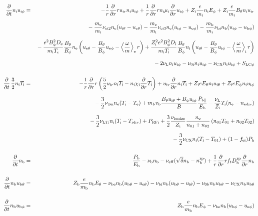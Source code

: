 \documentclass[11pt]{article}
\def\r#1{{\rm#1}}
\def\ddt{\frac{\partial}{\partial t}}
\def\ddr{\frac{\partial}{\partial r}}
\def\ave#1{\left\langle#1\right\rangle}
\def\me{m_\r{e}}
\def\mi{m_\r{i}}
\def\mb{m_\r{b}}
\def\mui{\mu_\r{i}}
\def\De{D_\r{e}}
\def\Di{D_\r{i}}
\def\chii{\chi_\r{i}}
\def\ne{n_\r{e}}
\def\ni{n_\r{i}}
\def\nb{n_\r{b}}
\def\uir{u_{\r{i}r}}
\def\ueth{u_{\r{e}\theta}}
\def\uith{u_{\r{i}\theta}}
\def\ubth{u_{\r{b}\theta}}
\def\ueph{u_{\r{e}\phi}}
\def\uiph{u_{\r{i}\phi}}
\def\ubph{u_{\r{b}\phi}}
\def\Eth{E_\theta}
\def\Eph{E_\phi}
\def\Bth{B_\theta}
\def\Bph{B_\phi}
\def\Te{T_\r{e}}
\def\Ti{T_\r{i}}
\def\nna{n_{01}}
\def\nnb{n_{02}}
\def\Zi{Z_\r{i}}
\def\Zb{Z_\r{b}}
\def\Pb{P_\r{b}}
\def\Eb{E_\r{b}}
\def\PRFi{P_\r{RFi}}
\def\Tna{T_{01}}
\def\Tnb{T_{02}}
\def\fei{f_\r{ei}}
\def\nbrp{n_\r{b}^\r{rp}}
\def\Pbpara{P_{\r{b}\parallel}}
\def\nueff{\nu_\r{eff}}
\def\Dbrp{D_\r{b}^\r{rp}}
\def\nuNCi{\nu_\r{NCi}}
\def\nube{\nu_\r{be}}
\def\nubi{\nu_\r{bi}}
\def\nuni{\nu_\r{0i}}
\def\nunb{\nu_\r{0b}}
\def\nuL{\nu_\r{L}}
\def\nuCX{\nu_\r{CX}}
\def\nuion{\nu_\r{ionize}}
\def\nub{\nu_\r{b}}
\def\nuTei{\nu_\r{Tei}}
\def\vb{v_\r{b}}
\def\nediv{n_\r{ediv}}
\def\Tidiv{T_\r{idiv}}
\def\nuLTi{\nu_{\r{L}T_\r{i}}}
\begin{document}
\begin{eqnarray}
%
  \ddt \ni \uiph &=&
%
  - \frac{1}{r} \ddr r \uir \ni \uiph
%
  + \frac{1}{r} \ddr r \ni \mui \ddr \uiph
%
  + \Zi \frac{e}{\mi} \ni \Eph
%
  + \Zi \frac{e}{\mi} \Bth \ni \uir 
\nonumber\\[2.5mm]&&{}
%
  - \frac{\me}{\mi} \nu_\r{ei2} \ne (\uith - \ueth)
%
  - \frac{\me}{\mi} \nu_\r{ei3} \ne (\uiph - \ueph)
%
  - \frac{\mb}{\mi} \nubi \nb (\uiph - \ubph)
\nonumber\\[2.5mm]&&{}
%
  - \frac{e^2 \Bph^2 \De}{\mi\Te}\frac{\Bth}{\Bph}\ne
    \left(\ueth - \frac{\Bth}{\Bph}\ueph - \ave{\frac{\omega}{m}}_\r{e}
     r \right)
%
  + \frac{\Zi^2 e^2 \Bph^2 \Di}{\mi\Ti}\frac{\Bth}{\Bph}\ni
    \left(\uith - \frac{\Bth}{\Bph}\uiph - \ave{\frac{\omega}{m}}_\r{i}
     r \right)
\nonumber\\[2.5mm]&&{}
%
  - 2 \nuL \ni \uiph
%
  - \nuni \ni \uiph
%
  - \nuCX \ni \uiph
%
  + S_\r{LC\phi}
%
%
\\[5mm]
%
%
  \ddt \, \frac{3}{2} \ni \Ti &=&
%
 - \frac{1}{r} \ddr r
   \left( \frac{5}{2} \uir \ni \Ti - \ni \chii \ddr \Ti \right)
%
  + \uir \ddr \ni \Ti
%
  + \Zi e \Eth \ni \uith
%
  + \Zi e \Eph \ni \uiph
\nonumber\\[2.5mm]&&{}
%
  - \frac{3}{2} \nuTei \ne (\Ti - \Te)
%
  + \mb \vb \frac{\Bth \uith + \Bph \uiph}{B} \frac{\Pbpara}{\Eb}
%
  - \frac{\nuL}{\Zi} \Ti (\ne - \nediv)
\nonumber\\[2.5mm]&&{}
%
  - \frac{3}{2} \nuLTi \ni (\Ti - \Tidiv)
%
  + \PRFi
%
  + \frac{3}{2} \frac{\nuion}{\Zi} \frac{\ne}{\nna +\nnb}\, (\nna \Tna +
  \nnb \Tnb)
\nonumber\\[2.5mm]&&{}
%
  - \frac{3}{2} \nuCX \ni (\Ti - \Tna)
%
  + (1 - \fei) \Pb
\\[5mm]
%
%
  \ddt \nb &=&
%
    \frac{\Pb}{\Eb}
%
  - \nub \nb
%
  - \nueff (\sqrt{\delta}\nb - \nbrp)
%
  + \frac{1}{r} \ddr r f_t \Dbrp \ddr \nb
\\[5mm]
%
%
  \ddt \nb \ubth &=&
%
    \Zb \frac{e}{\mb} \nb \Eth
%
%
  - \nube \nb (\ubth - \ueth)
%
  - \nubi \nb (\ubth - \uith)
%
  - \nunb \nb \ubth
%
  - \nuCX \nb \ubth
\\[5mm]
%
%
  \ddt \nb \ubph &=&
%
  \Zb \frac{e}{\mb} \nb \Eph
%
  - \nube \nb (\ubph - \ueph)

\end{eqnarray}
\end{document}
